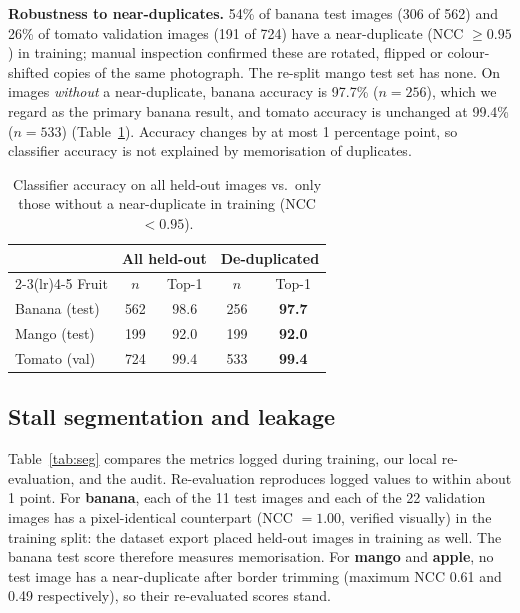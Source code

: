 \documentclass[10pt,twocolumn]{article}
\begin{document}
\textbf{Robustness to near-duplicates.} 54\% of banana test images (306 of 562) and 26\% of tomato validation images (191 of 724) have a near-duplicate (NCC $\ge 0.95$) in training; manual inspection confirmed these are rotated, flipped or colour-shifted copies of the same photograph. The re-split mango test set has none. On images \emph{without} a near-duplicate, banana accuracy is 97.7\% ($n=256$), which we regard as the primary banana result, and tomato accuracy is unchanged at 99.4\% ($n=533$) (Table~\ref{tab:leak_cls}). Accuracy changes by at most 1 percentage point, so classifier accuracy is not explained by memorisation of duplicates.

\begin{table}[t]
\centering\small
\caption{Classifier accuracy on all held-out images vs.\ only those without a near-duplicate in training (NCC $< 0.95$).}
\label{tab:leak_cls}
\begin{tabular}{@{}lcccc@{}}
\toprule
 & \multicolumn{2}{c}{All held-out} & \multicolumn{2}{c}{De-duplicated} \\
\cmidrule(lr){2-3}\cmidrule(lr){4-5}
Fruit & $n$ & Top-1 & $n$ & Top-1 \\
\midrule
Banana (test) & 562 & 98.6 & 256 & \textbf{97.7} \\
Mango (test)  & 199 & 92.0 & 199 & \textbf{92.0} \\
Tomato (val)  & 724 & 99.4 & 533 & \textbf{99.4} \\
\bottomrule
\end{tabular}
\end{table}

\subsection{Stall segmentation and leakage}
Table~\ref{tab:seg} compares the metrics logged during training, our local re-evaluation, and the audit. Re-evaluation reproduces logged values to within about 1 point. For \textbf{banana}, each of the 11 test images and each of the 22 validation images has a pixel-identical counterpart (NCC $=1.00$, verified visually) in the training split: the dataset export placed held-out images in training as well. The banana test score therefore measures memorisation. For \textbf{mango} and \textbf{apple}, no test image has a near-duplicate after border trimming (maximum NCC 0.61 and 0.49 respectively), so their re-evaluated scores stand.
\end{document}
